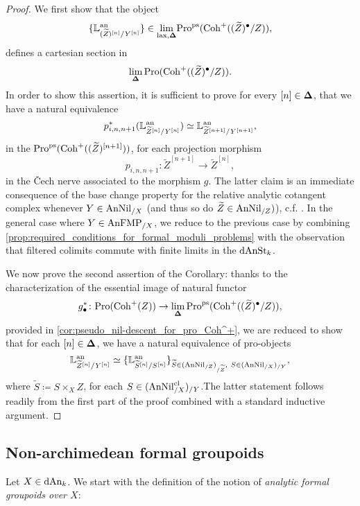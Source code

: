 \documentclass[10pt,a4paper,reqno]{amsart} %
\theoremstyle{plain}
\theoremstyle{definition}
\theoremstyle{remark}
\numberwithin{equation}{section}
\begin{document}
\begin{proof}
    We first show that the object
        \[\{ \mathbb L^\mathrm{an}_{(\widetilde Z)^{[n]}/ Y^{[n]}} \}  \in \underset{\mathrm{lax}, \bm{\Delta}}{\lim}\mathrm{Pro}^\mathrm{ps}(\mathrm{Coh}^+((\widetilde Z)^\bullet/ Z)),\]
    defines a cartesian section in
        \[
            \lim_{\bm{\Delta}} \mathrm{Pro}(\mathrm{Coh}^+((\widetilde Z)^\bullet / Z)).  
        \]
    In order to show this assertion, it is sufficient to prove for every $[n ] \in \bm{\Delta}$, that we have a natural equivalence
        \[
            p_{i, n, n+1}^*(\mathbb L^\mathrm{an}_{\widetilde Z^{[n]} / Y^{[n]}}) \simeq \mathbb L^\mathrm{an}_{\widetilde Z^{[n+1]}/ Y^{[n+1]}},  
        \]
    in the \infcat $\mathrm{Pro}^\mathrm{ps}(\mathrm{Coh}^+((\widetilde Z)^{[n+1]}))$, for each projection morphism
        \[
            p_{i, n, n+1} \colon \widetilde{Z}^{[n+1]} \to \widetilde{Z}^{[n]},
        \]
    in the \v{C}ech nerve associated to the morphism $g$.
    The latter claim is an immediate consequence of the base change property for the relative analytic
    cotangent complex whenever $Y \in \mathrm{AnNil}_{/X}$ (and thus so do $\widetilde Z \in \mathrm{AnNil}_{/Z})$), c.f.
    \cite[Proposition 5.12]{Porta_Yu_Representability}. In the general case where $Y \in \mathrm{AnFMP}_{/X}$, we reduce to the previous case
    by combining \cref{prop:required_conditions_for_formal_moduli_problems} with the observation that filtered colimits
    commute with finite limits in the \infcat $\mathrm{dAnSt}_k$. 

    We now prove the second assertion of the Corollary: thanks to the characterization of the essential image of natural functor
        \[
            g^*_{\bullet} \colon \mathrm{Pro}(\mathrm{Coh}^+(Z)) \to \lim_{\bm{\Delta}} \mathrm{Pro}^\mathrm{ps}(\mathrm{Coh}^+((\widetilde Z)^\bullet /Z)),  
        \]
    provided in \cref{cor:pseudo_nil-descent_for_pro_Coh^+}, we are reduced to show that for each $[n] \in \bm{\Delta}$, we have a natural
    equivalence of pro-objects
        \[
            \mathbb L^\mathrm{an}_{\widetilde Z^{[n]} / Y^{[n]}} \simeq \{ \mathbb L^\mathrm{an}_{\widetilde S^{[n]}/ S^{[n]}} \}_{\widetilde S \in (\mathrm{AnNil}_{/ Z})_{/\widetilde Z}, \ S \in (\mathrm{AnNil}_{/X})_{/ Y}},
        \]
    where $\tilde{S} \coloneqq S \times_X Z$, for each $S \in (\mathrm{AnNil}^{\mathrm{cl}}_{/ X})_{/ Y}$.The latter statement follows readily from the first part of the proof
    combined with a standard inductive argument.
\end{proof}


\subsection{Non-archimedean formal groupoids} Let $X \in \mathrm{dAn}_k$.
We start with the definition of the notion of \emph{analytic formal groupoids over $X$}:
\end{document}
